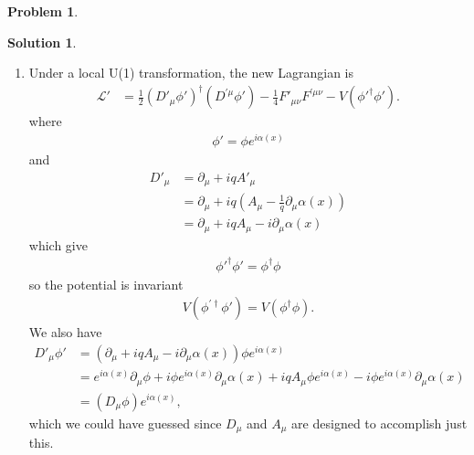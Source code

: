 \documentclass{book}
\numberwithin{equation}{section}
\theoremstyle{definition}
\newtheorem{prob}{Problem}[section]
\newtheorem{sln}{Solution}[section]
\newcommand{\p}{\partial}
\newcommand{\lag}{\mathcal{L}}
\begin{document}
\begin{prob}
	
		\begin{sln}
			$\,$
			\begin{enumerate}
				\item Under a local U(1) transformation, the new Lagrangian is
				\begin{align}
				\lag' 
				&= \frac{1}{2}(D'_\mu\phi')^\dagger(D^{'\mu}\phi') - \frac{1}{4}F'_{\mu\nu}F^{'\mu\nu} - V(\phi'^\dagger\phi').
				\end{align}
				where
				\begin{align}
				\phi' = \phi e^{i\alpha(x)}
				\end{align}
				and
				\begin{align}
				D'_\mu &= \p_\mu + iqA'_\mu\nonumber\\ 
				&= \p_\mu + iq\left(A_\mu - \frac{1}{q}\p_\mu\alpha(x)\right)\nonumber\\
				&= \p_\mu + iqA_\mu -i \p_\mu\alpha(x)
				\end{align}
				which give
				\begin{align}
				\phi'^\dagger\phi' = \phi^\dagger\phi
				\end{align}
				so the potential is invariant
				\begin{align}
				V(\phi^{'\dagger}\phi') = V(\phi^\dagger\phi).
				\end{align}
				We also have
				\begin{align}
				D'_\mu\phi' &= (\p_\mu + iqA_\mu -i \p_\mu\alpha(x))\phi e^{i\alpha(x)}\nonumber\\
				&= e^{i\alpha(x)}\p_\mu \phi + i\phi e^{i\alpha(x)} \p_\mu\alpha(x) + iqA_\mu \phi e^{i\alpha(x)} - i \phi e^{i\alpha(x)} \p_\mu\alpha(x) \nonumber\\
				&= (D_\mu \phi)e^{i\alpha(x)},
				\end{align}
				which we could have guessed since $D_\mu$ and $A_\mu$ are designed to accomplish just this.\\
				

\end{enumerate}
\end{sln}
\end{prob}
\end{document}
